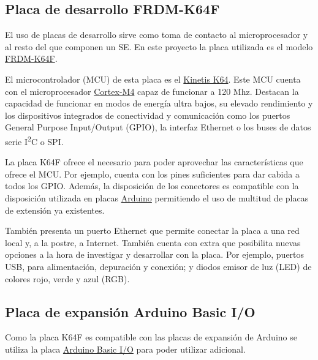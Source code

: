 \subsection{Placa de desarrollo FRDM-K64F}{\label{sec:k64f}}
El uso de placas de desarrollo sirve como toma de contacto al microprocesador y
al resto del  que componen un SE. En este proyecto la
placa utilizada es el modelo
\href{https://www.nxp.com/support/developer-resources/evaluation-and-development-boards/freedom-development-boards/mcu-boards/freedom-development-platform-for-kinetis-k64-k63-and-k24-mcus:FRDM-K64F}
{FRDM-K64F}.


El microcontrolador (MCU) de esta placa es el \href{https://www.nxp.com/products/processors-and-microcontrollers/arm-based-processors-and-mcus/kinetis-cortex-m-mcus/k-seriesperformancem4/k6x-ethernet/kinetis-k64-120-mhz-256kb-sram-microcontrollers-mcus-based-on-arm-cortex-m4-core:K64_120}
{Kinetis\textsuperscript{\tiny\textregistered} K64}. Este MCU cuenta con el
microprocesador \href{https://developer.arm.com/products/processors/cortex-m/cortex-m4}
{Cortex\textsuperscript{\tiny\textregistered}-M4} capaz de funcionar a 120 Mhz.
Destacan la capacidad de funcionar en modos de energía ultra bajos, su elevado
rendimiento y los dispositivos integrados de conectividad y comunicación como
los puertos General Purpose Input/Output (GPIO), la interfaz Ethernet o los
buses de datos serie I\textsuperscript{2}C o SPI.

La placa K64F ofrece el  necesario para poder aprovechar
las características que ofrece el MCU. Por ejemplo, cuenta con los pines
suficientes para dar cabida a todos los GPIO. Además, la disposición de los
conectores es compatible con la disposición utilizada en placas
\href{https://www.arduino.cc/}{Arduino} permitiendo el uso de multitud de placas
de extensión ya existentes.

También presenta un puerto Ethernet que permite conectar la placa a una red
local y, a la postre, a Internet. También cuenta con 
extra que posibilita nuevas opciones a la hora de investigar y desarrollar con
la placa. Por ejemplo, puertos USB, para alimentación, depuración y conexión; y
diodos emisor de luz (LED) de colores rojo, verde y azul (RGB).

\subsection{Placa de expansión Arduino Basic I/O}{\label{sec:basic-io}}
Como la placa K64F es compatible con las placas de expansión de Arduino se
utiliza la placa \href{https://web.archive.org/web/20160818213905/http://www.msebilbao.com/tienda/product_info.php?cPath=130&products_id=793&osCsid=f967e6ddeaaa2f19050972ff62295a08}
{Arduino Basic I/O} para poder utilizar  adicional.

